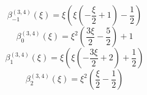 \begin{equation}
\beta_{-1}^{(3,4)} (\xi) =
 \xi \left(\xi \left(- \frac{\xi}{2} + 1\right) - \frac{1}{2}\right)
\end{equation}
\begin{equation}
\beta_{0}^{(3,4)} (\xi) =
 \xi^{2} \left(\frac{3 \xi}{2} - \frac{5}{2}\right) + 1
\end{equation}
\begin{equation}
\beta_{1}^{(3,4)} (\xi) =
 \xi \left(\xi \left(- \frac{3 \xi}{2} + 2\right) + \frac{1}{2}\right)
\end{equation}
\begin{equation}
\beta_{2}^{(3,4)} (\xi) =
 \xi^{2} \left(\frac{\xi}{2} - \frac{1}{2}\right)
\end{equation}

